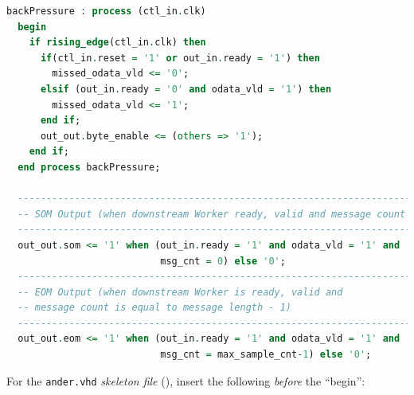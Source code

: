 \begin{lstlisting}[language=vhdl, columns=fullflexible, breaklines=true, prebreak=\textbackslash, basicstyle=\ttfamily, showstringspaces=false, upquote=true]
  backPressure : process (ctl_in.clk)
  begin
    if rising_edge(ctl_in.clk) then
      if(ctl_in.reset = '1' or out_in.ready = '1') then
        missed_odata_vld <= '0';
      elsif (out_in.ready = '0' and odata_vld = '1') then
        missed_odata_vld <= '1';
      end if;
      out_out.byte_enable <= (others => '1');
    end if;
  end process backPressure;

  -----------------------------------------------------------------------------
  -- SOM Output (when downstream Worker ready, valid and message count is zero)
  -----------------------------------------------------------------------------
  out_out.som <= '1' when (out_in.ready = '1' and odata_vld = '1' and
                           msg_cnt = 0) else '0';
  -----------------------------------------------------------------------------
  -- EOM Output (when downstream Worker is ready, valid and
  -- message count is equal to message length - 1)
  -----------------------------------------------------------------------------
  out_out.eom <= '1' when (out_in.ready = '1' and odata_vld = '1' and
                           msg_cnt = max_sample_cnt-1) else '0';
\end{lstlisting}
\bstart
For the \verb+ander.vhd+ \textit{skeleton file}  (), insert the following \textit{before} the ``begin'':

